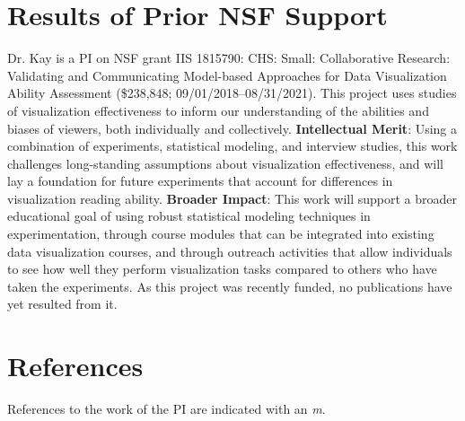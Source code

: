 \documentclass[11pt]{article}
\begin{document}
\section{Results of Prior NSF Support}
\noindent Dr. Kay is a PI on NSF grant IIS 1815790: CHS: Small: Collaborative Research: Validating and Communicating Model-based 
Approaches for Data Visualization Ability Assessment (\$238,848; 09/01/2018--08/31/2021).  This project uses studies of visualization effectiveness to inform our understanding of the abilities and biases of viewers, both individually and collectively. \textbf{Intellectual Merit}: Using a combination of experiments, statistical modeling, and interview studies, this work challenges long-standing assumptions about visualization effectiveness, and will lay a foundation for future experiments that account for differences in visualization reading ability. \textbf{Broader Impact}: This work will support a broader educational goal of using robust statistical modeling techniques in experimentation, through course modules that can be integrated into existing data visualization courses, and through outreach activities that allow individuals to see how well they perform visualization tasks compared to others who have taken the experiments. As this project was recently funded, no publications have yet resulted from it.


\newpage
\setcounter{page}{1}
\section*{References}
\noindent References to the work of the PI are indicated with an \emph{m}.




\end{document}

